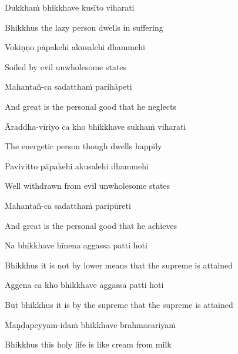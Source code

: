 Dukkhaṁ bhikkhave kusīto viharati

\begin{english}
  Bhikkhus the lazy person dwells in suffering
\end{english}

Vokiṇṇo pāpakehi akusalehi dhammehi

\begin{english}
  Soiled by evil unwholesome states
\end{english}

Mahantañ-ca sadatthaṁ parihāpeti

\begin{english}
  And great is the personal good that he neglects
\end{english}

Āraddha-vīriyo ca kho bhikkhave sukhaṁ viharati

\begin{english}
  The energetic person though dwells happily
\end{english}

Pavivitto pāpakehi akusalehi dhammehi

\begin{english}
  Well withdrawn from evil\makeatletter\hyperlink{endnote88-appendix}\makeatother
  unwholesome states
\end{english}

Mahantañ-ca sadatthaṁ paripūreti

\begin{english}
  And great is the personal good that he achieves
\end{english}

Na bhikkhave hīnena aggassa patti hoti

\begin{english}
  Bhikkhus it is not by lower means that the supreme is attained
\end{english}

Aggena ca kho bhikkhave aggassa patti hoti

\begin{english}
  But bhikkhus it is by the supreme that the supreme is attained
\end{english}

Maṇḍapeyyam-idaṁ bhikkhave brahmacariyaṁ

\begin{english}
  Bhikkhus this holy life is like cream from milk\makeatletter\hyperlink{endnote89-appendix}\makeatother
\end{english}

